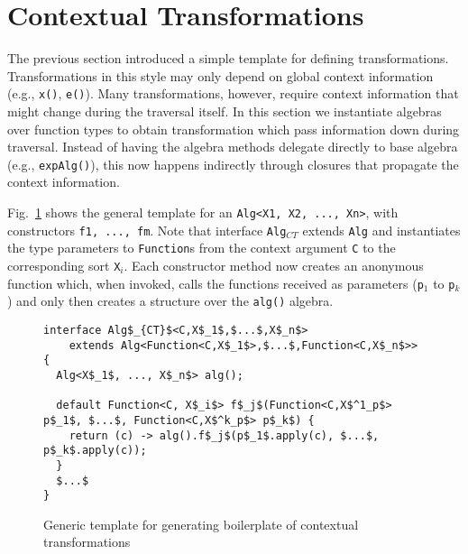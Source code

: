 \section{Contextual Transformations}\label{sec:contexttrans}

The previous section introduced a simple template for defining transformations.
Transformations in this style may only depend on global context information (e.g., \lstinline{x()}, \lstinline{e()}).
Many transformations, however, require context information that might change during the traversal itself.
In this section we instantiate algebras over function types to obtain transformation which pass information down during traversal.
Instead of having the algebra methods delegate directly to base algebra (e.g., \lstinline{expAlg()}), this now happens indirectly through closures that propagate the context information.

Fig.~\ref{ctxTrafoTemplate} shows the general template for an \lstinline{Alg<X1, X2, ..., Xn>}, with constructors \lstinline{f1, ..., fm}.
Note that interface \lstinline{Alg}$_{CT}$ extends \lstinline{Alg} and instantiates the type parameters to \lstinline{Function}s from the context argument \lstinline{C} to the corresponding sort \lstinline{X}$_i$.
Each constructor method now creates an anonymous function which, when invoked, calls the functions received as parameters (\lstinline{p}$_1$ to \lstinline{p}$_k$) and only then creates a structure over the \lstinline{alg()} algebra.

\begin{figure}[t]
\nocaptionrule
\begin{lstlisting}[mathescape=true]
interface Alg$_{CT}$<C,X$_1$,$...$,X$_n$>
    extends Alg<Function<C,X$_1$>,$...$,Function<C,X$_n$>> {
  Alg<X$_1$, ..., X$_n$> alg();

  default Function<C, X$_i$> f$_j$(Function<C,X$^1_p$> p$_1$, $...$, Function<C,X$^k_p$> p$_k$) {
    return (c) -> alg().f$_j$(p$_1$.apply(c), $...$, p$_k$.apply(c));
  }
  $...$
}
\end{lstlisting}
\caption{Generic template for generating boilerplate of contextual transformations}
\label{ctxTrafoTemplate}
\end{figure}

